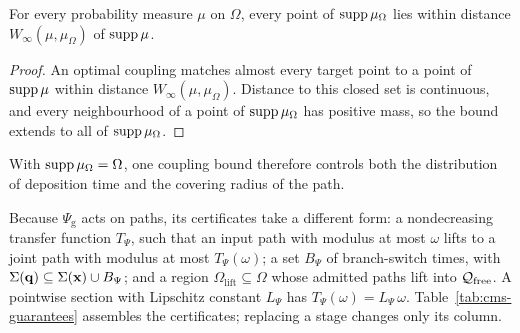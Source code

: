 \begin{corollary}
  \label{cor:cms-covering-radius}
  For every probability measure $\mu$ on $\Omega$, every point of $\operatorname{supp}\mu_\Omega$ lies within distance $W_\infty(\mu,\mu_\Omega)$ of $\operatorname{supp}\mu$.
\end{corollary}
\begin{proof}
  An optimal coupling matches almost every target point to a point of $\operatorname{supp}\mu$ within distance $W_\infty(\mu,\mu_\Omega)$. Distance to this closed set is continuous, and every neighbourhood of a point of $\operatorname{supp}\mu_\Omega$ has positive mass, so the bound extends to all of $\operatorname{supp}\mu_\Omega$.
\end{proof}
With $\operatorname{supp}\mu_\Omega=\Omega$, one coupling bound therefore controls both the distribution of deposition time and the covering radius of the path.

Because $\Psi_{\mathrm{g}}$ acts on paths, its certificates take a different form: a nondecreasing transfer function $T_\Psi$, such that an input path with modulus at most $\omega$ lifts to a joint path with modulus at most $T_\Psi(\omega)$; a set $B_\Psi$ of branch-switch times, with $\Sigma({\bm{\mathrm{q}}})\subseteq\Sigma({\bm{\mathrm{x}}})\cup B_\Psi$; and a region ${\Omega_{\mathrm{lift}}}\subseteq\Omega$ whose admitted paths lift into $\mathcal{Q}_{\mathrm{free}}$. A pointwise section with Lipschitz constant $L_\Psi$ has $T_\Psi(\omega)=L_\Psi\,\omega$. Table~\ref{tab:cms-guarantees} assembles the certificates; replacing a stage changes only its column.

